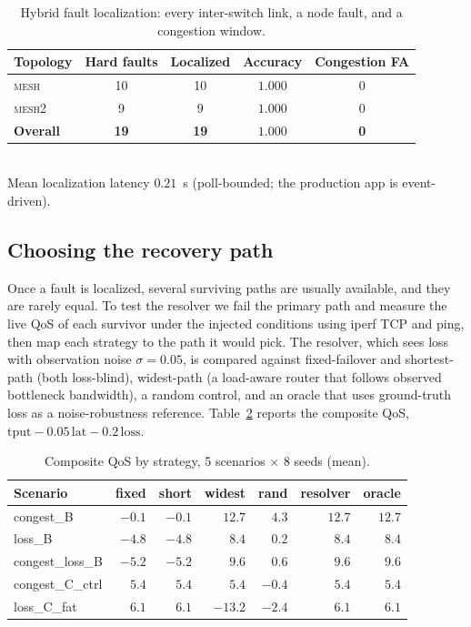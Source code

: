 \documentclass[conference]{IEEEtran}
\begin{document}
\begin{table}[t]
\caption{Hybrid fault localization: every inter-switch link, a node fault, and a
congestion window.}
\label{tab:localize}
\centering
\begin{tabular}{lcccc}
\toprule
Topology & Hard faults & Localized & Accuracy & Congestion FA \\
\midrule
\textsc{mesh}  & 10 & 10 & $1.000$ & 0 \\
\textsc{mesh2} &  9 &  9 & $1.000$ & 0 \\
\midrule
\textbf{Overall} & \textbf{19} & \textbf{19} & $\mathbf{1.000}$ & \textbf{0} \\
\bottomrule
\end{tabular}\\[2pt]
\footnotesize Mean localization latency $0.21$~s (poll-bounded; the production app is
event-driven). %
\end{table}

\subsection{Choosing the recovery path}
\label{sec:resolve}
Once a fault is localized, several surviving paths are usually available, and they
are rarely equal. To test the resolver we fail the primary path and measure the
live QoS of each survivor under the injected conditions using iperf TCP and ping,
then map each strategy to the path it would pick. The resolver, which sees loss with
observation noise $\sigma=0.05$, is compared against fixed-failover and shortest-path
(both loss-blind), widest-path (a load-aware router that follows observed bottleneck
bandwidth), a random control, and an oracle that uses ground-truth loss as a
noise-robustness reference.
Table~\ref{tab:resolve} reports the composite QoS,
$\text{tput}-0.05\,\text{lat}-0.2\,\text{loss}$.

\begin{table}[t]
\caption{Composite QoS by strategy, 5 scenarios $\times$ 8 seeds (mean).}
\label{tab:resolve}
\centering
\footnotesize
\begin{tabular}{lrrrrrr}
\toprule
Scenario & fixed & short & widest & rand & \textbf{resolver} & oracle \\
\midrule
congest\_B      & $-0.1$ & $-0.1$ & $12.7$ & $4.3$  & $\mathbf{12.7}$ & $12.7$ \\
loss\_B         & $-4.8$ & $-4.8$ & $8.4$  & $0.2$  & $\mathbf{8.4}$  & $8.4$  \\
congest\_loss\_B& $-5.2$ & $-5.2$ & $9.6$  & $0.6$  & $\mathbf{9.6}$  & $9.6$  \\
congest\_C\_ctrl& $5.4$  & $5.4$  & $5.4$  & $-0.4$ & $\mathbf{5.4}$  & $5.4$  \\
loss\_C\_fat    & $6.1$  & $6.1$  & $-13.2$& $-2.4$ & $\mathbf{6.1}$  & $6.1$  \\
\bottomrule
\end{tabular}
\end{table}
\end{document}
